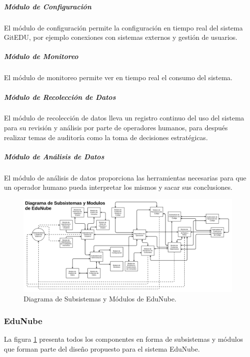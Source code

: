 \subparagraph{Módulo de Configuración}
El módulo de configuración permite la configuración en tiempo real del sistema GitEDU, por ejemplo conexiones con sistemas externos y gestión de usuarios.

\subparagraph{Módulo de Monitoreo}
El módulo de monitoreo permite ver en tiempo real el consumo del sistema.

\subparagraph{Módulo de Recolección de Datos}
El módulo de recolección de datos lleva un registro continuo del uso del sistema para su revisión y análisis por parte de operadores humanos, para después realizar temas de auditoría como la toma de decisiones estratégicas.

\subparagraph{Módulo de Análisis de Datos}
El módulo de análisis de datos proporciona las herramientas necesarias para que un operador humano pueda interpretar los mismos y sacar sus conclusiones.

\pagebreak

\begin{landscape}

	\begin{figure}
	  \begin{center}
	    \includegraphics[width=1.7\textwidth]{Figures/mod_en.png}
	  \end{center}
	  \caption{Diagrama de Subsistemas y Módulos de EduNube.}
	  \label{mod_en}
	\end{figure}

\end{landscape}

\subsubsection{EduNube}

La figura \ref{mod_en} presenta todos los componentes en forma de subsistemas y módulos que forman parte del diseño propuesto para el sistema EduNube.

